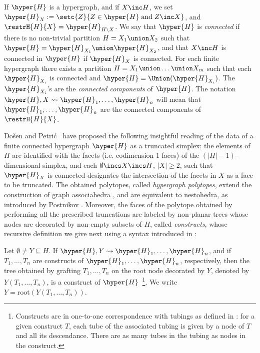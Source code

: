 \smallskip
 
If $\hyper{H}$ is a hypergraph,  and if  $X\inc H$, we set
$\hyper{H}_X:=\setc{Z}{Z\in \hyper{H}\;\mbox{and}\; Z\inc X}$, and $\restrH{H}{X}=\hyper{H}_{H\backslash X}$.
We say that $\hyper{H}$ is {\em connected} if there is no non-trivial partition $H=X_1\union X_2$ such that $\hyper{H}=\hyper{H}_{X_1}\union \hyper{H}_{X_2}$, and that $X\inc H$ is connected in $\hyper{H}$ if $\hyper{H}_X$ is connected.
For each finite hypergraph there exists a partition
$H=X_1\union\ldots\union X_m$ such that each $\hyper{H}_{X_i}$ is connected and $\hyper{H}=\Union(\hyper{H}_{X_i})$.  The $\hyper{H}_{X_i}$'s are  the {\em connected components} of $\hyper{H}$. The notation
$\hyper{H},X  \leadsto \hyper{H}_1,\ldots, \hyper{H}_n$
 will mean that  $\hyper{H}_1,\ldots,\hyper{H}_n$ are  the
 connected components of $\restrH{H}{X}$.  

\smallskip

Do\v sen and Petri\'c~\cite{DP} have proposed the following insightful reading of the data of a finite connected hypergraph $\hyper{H}$ as a truncated simplex: the elements of $H$ are identified with the facets (i.e. codimension 1 faces) of the $(|H|-1)$-dimensional simplex, and each $\emptyset\incs X\incs H$, $|X|\geq 2$, such that    $\hyper{H}_X$ is connected designates the intersection of the facets in $X$ as a face to be truncated.
The obtained polytopes, called \emph{hypergraph polytopes}, extend the construction of graph associahedra \cite{CD-CCGA, Zel06}, and are equivalent to nestohedra, as introduced by Postnikov \cite{P09}.  Moreover,  the faces of the   polytope obtained by performing  all the prescribed truncations  are labeled by non-planar trees whose nodes are decorated by non-empty subsets of $H$, called {\em constructs}, whose recursive definition  we give next using a syntax introduced in \cite{COI}:

\smallskip
Let  $\emptyset\neq Y\subseteq H$. If   $\hyper{H},Y  \leadsto \hyper{H}_1,\ldots, \hyper{H}_n$, and if  $T_1,\ldots,T_n$ are constructs of $\hyper{H}_1,\ldots,\hyper{H}_n$, respectively, then the tree obtained by grafting $T_1,\ldots,T_n$ on the root node decorated by $Y$, denoted by $Y(T_1,\ldots,T_n)$, is a construct of  $\hyper{H}$~\footnote{\label{construct-tubing} Constructs are in one-to-one correspondence with tubings as defined in \cite{CD-CCGA}: for a given construct $T$, each tube of the associated tubing is given by a node of $T$ and all its descendance. There are  as many tubes in the tubing as nodes in the construct.}. We write $Y=\mbox{root}(Y(T_1,\ldots,T_n))$.

